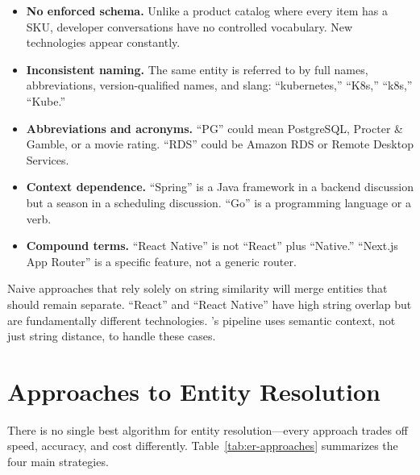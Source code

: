 \begin{itemize}
    \item \textbf{No enforced schema.} Unlike a product catalog where every
          item has a SKU, developer conversations have no controlled vocabulary.
          New technologies appear constantly.
    \item \textbf{Inconsistent naming.} The same entity is referred to by full
          names, abbreviations, version-qualified names, and slang:
          ``kubernetes,'' ``K8s,'' ``k8s,'' ``Kube.''
    \item \textbf{Abbreviations and acronyms.} ``PG'' could mean PostgreSQL,
          Procter \& Gamble, or a movie rating. ``RDS'' could be Amazon RDS or
          Remote Desktop Services.
    \item \textbf{Context dependence.} ``Spring'' is a Java framework in a
          backend discussion but a season in a scheduling discussion. ``Go''
          is a programming language or a verb.
    \item \textbf{Compound terms.} ``React Native'' is not ``React'' plus
          ``Native.'' ``Next.js App Router'' is a specific feature, not a
          generic router.
\end{itemize}

\begin{warning}
Naive approaches that rely solely on string similarity will merge entities that
should remain separate. ``React'' and ``React Native'' have high string overlap
but are fundamentally different technologies. \sysname{}'s pipeline uses
semantic context, not just string distance, to handle these cases.
\end{warning}

\section{Approaches to Entity Resolution}
\label{sec:er-approaches}

There is no single best algorithm for entity resolution---every approach trades
off speed, accuracy, and cost differently. Table~\ref{tab:er-approaches}
summarizes the four main strategies.


